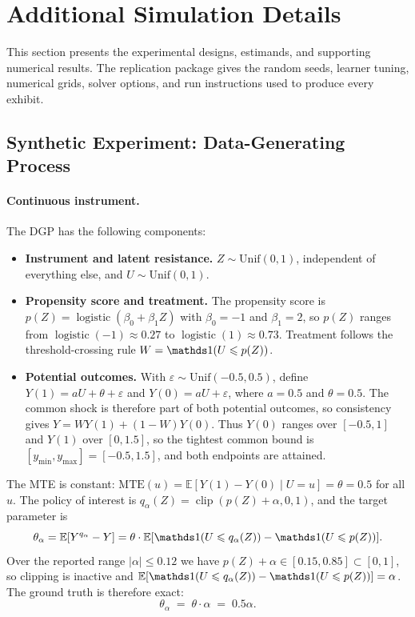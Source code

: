 \section{Additional Simulation Details}\label{app:simulation}

This section presents the experimental designs, estimands, and supporting numerical results. The replication package gives the random seeds, learner tuning, numerical grids, solver options, and run instructions used to produce every exhibit.

\subsection{Synthetic Experiment: Data-Generating Process}

\paragraph{Continuous instrument.}
The DGP has the following components:
\begin{itemize}
    \item \textbf{Instrument and latent resistance.} $Z \sim \text{Unif}(0,1)$, independent of everything else, and $U \sim \text{Unif}(0,1)$.

    \item \textbf{Propensity score and treatment.} The propensity score is $p(Z) = \operatorname{logistic}(\beta_0 + \beta_1 Z)$ with $\beta_0 = -1$ and $\beta_1 = 2$, so $p(Z)$ ranges from $\operatorname{logistic}(-1) \approx 0.27$ to $\operatorname{logistic}(1) \approx 0.73$. Treatment follows the threshold-crossing rule $W = \indicator(U \leqslant p(Z))$.

    \item \textbf{Potential outcomes.} With $\varepsilon \sim \text{Unif}(-0.5, 0.5)$, define $Y(1) = aU + \theta + \varepsilon$ and $Y(0) = aU + \varepsilon$, where $a = 0.5$ and $\theta = 0.5$. The common shock is therefore part of both potential outcomes, so consistency gives $Y = WY(1) + (1-W)Y(0)$. Thus $Y(0)$ ranges over $[-0.5, 1]$ and $Y(1)$ over $[0, 1.5]$, so the tightest common bound is $[y_{\min}, y_{\max}] = [-0.5, 1.5]$, and both endpoints are attained.
\end{itemize}

\noindent The MTE is constant: $\text{MTE}(u) = \mathbb{E}[Y(1)-Y(0)\mid U=u] = \theta = 0.5$ for all $u$. The policy of interest is $q_\alpha(Z) = \operatorname{clip}(p(Z) + \alpha, 0, 1)$, and the target parameter is
\[
    \theta_\alpha = \mathbb{E}[Y^{q_\alpha} - Y] = \theta \cdot \mathbb{E}[\indicator(U \leqslant q_\alpha(Z)) - \indicator(U \leqslant p(Z))].
\]
Over the reported range $|\alpha|\leqslant 0.12$ we have $p(Z)+\alpha \in [0.15, 0.85] \subset [0,1]$, so clipping is inactive and $\mathbb{E}[\indicator(U \leqslant q_\alpha(Z)) - \indicator(U \leqslant p(Z))] = \alpha$. The ground truth is therefore exact:
\[
    \theta_\alpha \;=\; \theta \cdot \alpha \;=\; 0.5\alpha .
\]

